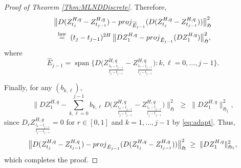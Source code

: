 \documentclass[10pt,a4paper]{amsart}
\newcommand\HHH{\mathfrak{H}}
\begin{document}
\begin{proof}[Proof of Theorem \ref{Thm:MLNDDiscrete}]
Therefore,
\begin{align*}
&\big\| D(Z^{H,q}_{t_j}-Z^{H,q}_{t_{j-1}}) - {\rm proj}_{\widetilde{E}_{j-1}}(D(Z^{H,q}_{t_j}-Z^{H,q}_{t_{j-1}})) \big\|_{\HHH}^2\\
&\;\overset{\text{law}}{=}\; (t_j-t_{j-1})^{2H}\,
   \big\| DZ^{H,q}_{1} - {\rm proj}_{\hat{E}_{j-1}}(DZ^{H,q}_{1}) \big\|_{\HHH}^2,
\end{align*}
where
\[
\hat{E}_{j-1}=\operatorname{span}\Big\{ D\!\Big(Z^{H,q}_{\frac{t_k-t_{j-1}}{t_j-t_{j-1}}}-Z^{H,q}_{\frac{t_\ell-t_{j-1}}{t_j-t_{j-1}}}\Big): k,\ell=0,\ldots,j-1\Big\}.
\]

Finally, for any $(b_{k,\ell})$,
\[
\Big\| DZ^{H,q}_{1} - \sum_{k,\ell=0}^{j-1} b_{k,\ell}\,D\!\Big(Z^{H,q}_{\frac{t_k-t_{j-1}}{t_j-t_{j-1}}}-Z^{H,q}_{\frac{t_\ell-t_{j-1}}{t_j-t_{j-1}}}\Big)\Big\|_{\HHH}^2
\;\ge\; \|DZ^{H,q}_1\|_{\HHH_1}^2,
\]
since $D_r Z^{H,q}_{\frac{t_k-t_{j-1}}{t_j-t_{j-1}}}=0$ for $r\in[0,1]$ and $k=1,\dots,j-1$ by \eqref{eq:adapt}.  
Thus,
\[
\big\| D(Z^{H,q}_{t_j}-Z^{H,q}_{t_{j-1}}) - {\rm proj}_{\hat{E}_{j-1}}(D(Z^{H,q}_{t_j}-Z^{H,q}_{t_{j-1}})) \big\|_{\HHH}^2
\;\ge\; \|DZ^{H,q}_1\|_{\HHH_1}^2,
\]
which completes the proof.
\end{proof}
\end{document}

